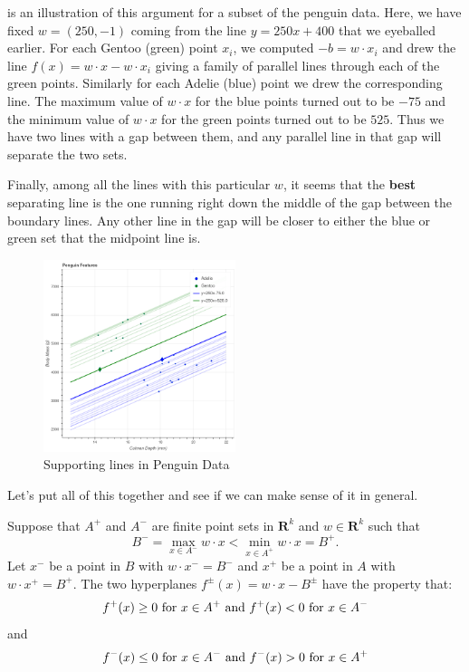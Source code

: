 \documentclass[
]{article}
\begin{document}
 is an illustration of this argument for a subset
of the penguin data. Here, we have fixed \(w=(250,-1)\) coming from the
line \(y=250x+400\) that we eyeballed earlier. For each Gentoo (green)
point \(x_{i}\), we computed \(-b=w\cdot x_{i}\) and drew the line
\(f(x) = w\cdot x - w\cdot x_{i}\) giving a family of parallel lines
through each of the green points. Similarly for each Adelie (blue) point
we drew the corresponding line. The maximum value of \(w\cdot x\) for
the blue points turned out to be \(-75\) and the minimum value of
\(w\cdot x\) for the green points turned out to be \(525\). Thus we have
two lines with a gap between them, and any parallel line in that gap
will separate the two sets.

Finally, among all the lines with this particular \(w\), it seems that
the \textbf{best} separating line is the one running right down the
middle of the gap between the boundary lines. Any other line in the gap
will be closer to either the blue or green set that the midpoint line
is.

\begin{figure}
\hypertarget{fig:penguinhwy2}{%
\centering
\includegraphics[width=0.5\textwidth,height=\textheight]{../img/penguinhwy2.png}
\caption{Supporting lines in Penguin Data}\label{fig:penguinhwy2}
}
\end{figure}

Let's put all of this together and see if we can make sense of it in
general.

Suppose that \(A^{+}\) and \(A^{-}\) are finite point sets in
\(\mathbf{R}^{k}\) and \(w\in\mathbf{R}^{k}\) such that \[
B^{-}=\max_{x\in A^{-}}w\cdot x < \min_{x\in A^{+}}w\cdot x=B^{+}.
\] Let \(x^{-}\) be a point in \(B\) with \(w\cdot x^{-}=B^{-}\) and
\(x^{+}\) be a point in \(A\) with \(w\cdot x^{+}=B^{+}\). The two
hyperplanes \(f^{\pm}(x) = w\cdot x - B^{\pm}\) have the property that:
\[
f^{+}(x)\ge 0\hbox{ for }x\in A^{+}\hbox{ and }f^{+}(x)<0\hbox{ for }x\in A^{-}
\] and \[
f^{-}(x)\le 0\hbox{ for }x\in A^{-}\hbox{ and }f^{-}(x)>0\hbox{ for }x\in A^{+}
\]
\end{document}
